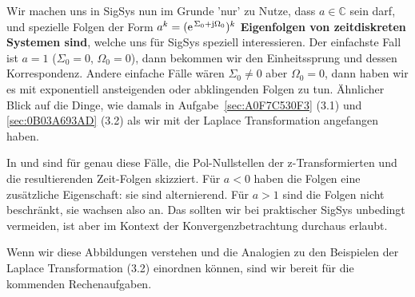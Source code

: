 Wir machen uns in SigSys nun im Grunde 'nur' zu Nutze, dass $a\in\mathbb{C}$
sein darf, und spezielle Folgen der Form $a^k=(\e^{\Sigma_0 +\im\Omega_0})^k$
\textbf{Eigenfolgen von zeitdiskreten Systemen sind}, welche uns für SigSys speziell
interessieren.
%
Der einfachste Fall ist $a=1$ ($\Sigma_0=0$, $\Omega_0=0$),
dann bekommen wir den Einheitssprung und dessen Korrespondenz.
%
Andere einfache Fälle wären $\Sigma_0 \neq 0$ aber $\Omega_0=0$,
dann haben wir es mit exponentiell ansteigenden oder abklingenden Folgen zu tun.
Ähnlicher Blick auf die Dinge, wie damals in Aufgabe~\ref{sec:A0F7C530F3} (3.1) und \ref{sec:0B03A693AD} (3.2) als wir
mit der Laplace Transformation angefangen haben.

In  und
sind für genau diese Fälle, die Pol-Nullstellen der z-Transformierten
und die resultierenden Zeit-Folgen skizziert.
%
Für $a<0$ haben die Folgen eine zusätzliche Eigenschaft: sie sind alternierend.
Für $a>1$ sind die Folgen nicht beschränkt, sie wachsen also an. Das sollten wir
bei praktischer SigSys unbedingt vermeiden, ist aber im Kontext der
Konvergenzbetrachtung durchaus erlaubt.

Wenn wir diese Abbildungen verstehen und die Analogien zu den Beispielen
der Laplace Transformation  (3.2)
einordnen können, sind wir bereit für
die kommenden Rechenaufgaben.








\newpage
